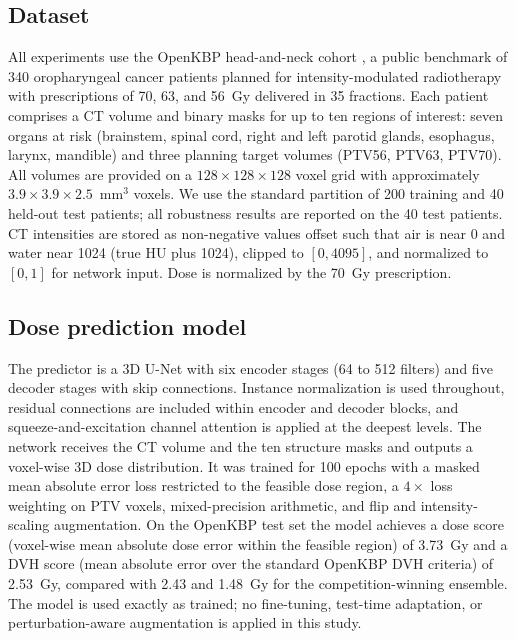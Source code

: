 \documentclass[11pt]{article}
\begin{document}
\subsection{Dataset}

All experiments use the OpenKBP head-and-neck cohort
\citep{babier2021openkbp}, a public benchmark of 340 oropharyngeal cancer
patients planned for intensity-modulated radiotherapy with prescriptions of
70, 63, and 56~Gy delivered in 35 fractions. Each patient comprises a CT
volume and binary masks for up to ten regions of interest: seven organs at
risk (brainstem, spinal cord, right and left parotid glands, esophagus,
larynx, mandible) and three planning target volumes (PTV56, PTV63, PTV70).
All volumes are provided on a $128 \times 128 \times 128$ voxel grid with
approximately $3.9 \times 3.9 \times 2.5$~mm$^3$ voxels. We use the standard
partition of 200 training and 40 held-out test patients; all robustness
results are reported on the 40 test patients. CT intensities are stored as
non-negative values offset such that air is near 0 and water near 1024
(true HU plus 1024), clipped to $[0, 4095]$, and normalized to $[0,1]$ for
network input. Dose is normalized by the 70~Gy prescription.

\subsection{Dose prediction model}

The predictor is a 3D U-Net \citep{ronneberger2015unet} with six encoder
stages (64 to 512 filters) and five decoder stages with skip connections.
Instance normalization is used throughout, residual connections are included
within encoder and decoder blocks, and squeeze-and-excitation channel
attention \citep{hu2018squeeze} is applied at the deepest levels. The network
receives the CT volume and the ten structure masks and outputs a voxel-wise
3D dose distribution. It was trained for 100 epochs with a masked mean
absolute error loss restricted to the feasible dose region, a $4\times$
loss weighting on PTV voxels, mixed-precision arithmetic, and flip and
intensity-scaling augmentation. On the OpenKBP test set the model achieves a
dose score (voxel-wise mean absolute dose error within the feasible region)
of 3.73~Gy and a DVH score (mean absolute error over the standard OpenKBP DVH
criteria) of 2.53~Gy, compared with 2.43 and 1.48~Gy for the competition-winning
ensemble. The model is used exactly as trained; no fine-tuning, test-time
adaptation, or perturbation-aware augmentation is applied in this study.
\end{document}

